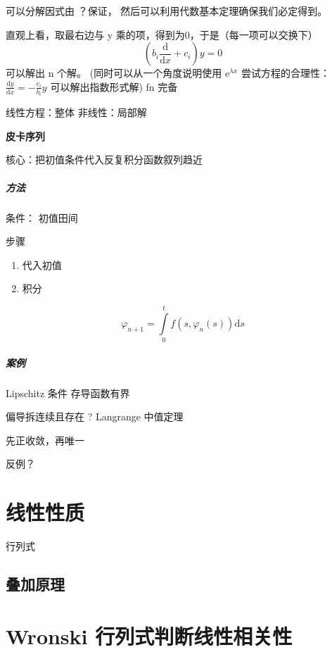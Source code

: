 \documentclass[11pt]{report}
\begin{document}
可以分解因式由
？保证，
然后可以利用代数基本定理确保我们必定得到。

直观上看，取最右边与 y 乘的项，得到为0，于是（每一项可以交换下）
\begin{equation}
\label{eq:31}
(b_i \frac{\mathrm{d}}{\mathrm{d}x}+c_i)y  =  0
\end{equation}
可以解出 n 个解。
(同时可以从一个角度说明使用 \(\mathrm{e}^{\lambda x}\) 尝试方程的合理性：
\(\frac{\mathrm{d}y}{\mathrm{d}x}=-\frac{c_i}{b_i}y\) 可以解出指数形式解)
fn 完备

线性方程：整体
非线性：局部解

{\bf 皮卡序列}

核心：把初值条件代入反复积分函数叙列趋近

\paragraph{方法}
条件：
初值田间

步骤
\begin{enumerate}
\item 代入初值
\item 积分
\end{enumerate}
$$\varphi_{n+1}=\int\limits_0^tf(s,\varphi_n(s))\mathrm{d}s$$   

\paragraph{案例}

Lipschitz 条件
存导函数有界

偏导拆连续且存在
? Langrange 中值定理


先正收敛，再唯一

反例？

\chapter{线性性质}
\label{sec:orgfe36170}
行列式

\section{叠加原理}
\label{sec:org3d96926}
\chapter{Wronski 行列式判断线性相关性}
\label{sec:org6ce8119}
\end{document}
